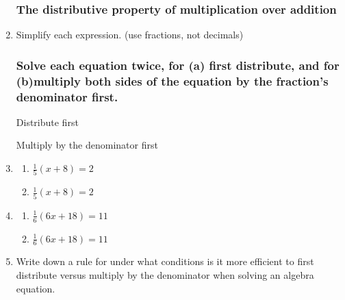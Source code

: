 \documentclass[12pt, twoside]{article}
\begin{document}
\begin{enumerate}
\newpage
\subsubsection*{The distributive property of multiplication over addition}
\item Simplify each expression. (use fractions, not decimals)
\begin{enumerate}[itemsep=2cm]
\end{enumerate} \vspace{1cm}

\subsubsection*{Solve each equation twice, for (a) first distribute, and for (b)multiply both sides of the equation by the fraction's denominator first.}
\begin{multicols}{2}
  Distribute first \par 
  Multiply by the denominator first
\end{multicols}
\item 
  \begin{multicols}{2}
    \begin{enumerate}
      \item $\frac{1}{5}(x+8)=2$
      \item $\frac{1}{5}(x+8)=2$
    \end{enumerate}
  \end{multicols} \vspace{3cm}

\item 
  \begin{multicols}{2}
    \begin{enumerate}
      \item $\frac{1}{6}(6x+18)=11$
      \item $\frac{1}{6}(6x+18)=11$
    \end{enumerate}
  \end{multicols} \vspace{3cm}

\item Write down a rule for under what conditions is it more efficient to first distribute versus multiply by the denominator when solving an algebra equation.

\newpage
  
\end{enumerate}
\end{document}
